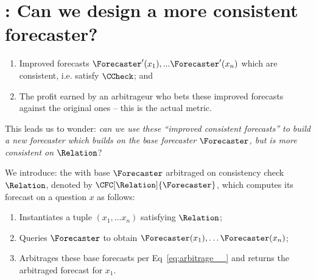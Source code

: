 


\section{\CFCaster{}: Can we design a more consistent forecaster?}
\label{cfc/sec:cfcaster}


\begin{enumerate}
    \item Improved forecasts $\Forecaster'(x_1), ... \Forecaster'(x_n)$ which are consistent, i.e. satisfy $\CCheck$; and
    \item The profit earned by an arbitrageur who bets these improved forecasts against the original ones -- this is the actual metric.
\end{enumerate}

This leads us to wonder: \emph{can we use these ``improved consistent forecasts'' to build a new forecaster which builds on the base forecaster $\Forecaster$, but is more consistent on $\Relation$}?

We introduce: the \CFCaster{} with base $\Forecaster$ arbitraged on consistency check $\Relation$, denoted by $\CFC[\Relation]{\Forecaster}$, which computes its forecast on a question $x$ as follows:
\begin{enumerate}
    \item Instantiates a tuple $(x_1,\dots x_n)$ satisfying $\Relation$;
    \item Queries $\Forecaster$ to obtain $\Forecaster(x_1),\dots\Forecaster(x_n)$;
    \item Arbitrages these base forecasts per Eq~\ref{eq:arbitrage__} and returns the arbitraged forecast for $x_1$.
\end{enumerate}

